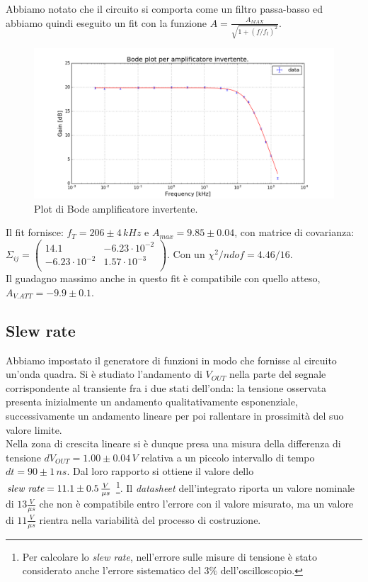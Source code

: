 \documentclass[10pt,a4paper]{article}
\begin{document}
Abbiamo notato che il circuito si comporta come un filtro passa-basso ed abbiamo quindi  eseguito un fit con la funzione $ A=\frac{A_{MAX}}{\sqrt{1+(f/f_t)^2}}$.

\begin{figure}[!htb]
  \centering
  \includegraphics[scale=0.6]{bodePlot.png}
\caption{Plot di Bode amplificatore invertente.}
\label{graficoBode}
\end{figure}

Il fit fornisce: $f_T = 206 \pm 4 \, kHz$ e $A_{max} = 9.85 \pm 0.04$, con matrice di covarianza:\\
$ \Sigma_{ij} = \left( \begin{array}{cc}
14.1 & -6.23 \cdot 10^{-2} \\ 
-6.23 \cdot 10^{-2} & 1.57 \cdot 10^{-3}\\
\end{array} \right)$. Con un $\chi^2/ndof = 4.46/16$.\\

Il guadagno massimo anche in questo fit è compatibile con quello atteso, $A_{V.ATT}= -9.9 \pm 0.1$.

\subsection{Slew rate}
Abbiamo impostato il generatore di funzioni in modo che fornisse al circuito un’onda quadra. Si è studiato l'andamento di $V_{OUT}$ nella parte del segnale corrispondente al transiente fra i due stati dell’onda: la tensione osservata presenta inizialmente un andamento qualitativamente esponenziale, successivamente un andamento lineare per poi rallentare in prossimità del suo valore limite.\\
Nella zona di crescita lineare si è dunque presa una misura della differenza di tensione $dV_{OUT} = 1.00 \pm 0.04 \, V$ relativa a un piccolo intervallo di tempo $dt=90 \pm 1 \, ns$. Dal loro rapporto si ottiene il valore dello $\emph{slew rate}= 11.1 \pm 0.5 \, \frac{V}{\mu s}$ \footnote{Per calcolare lo \emph{slew rate}, nell'errore sulle misure di tensione è stato considerato anche l'errore sistematico del $3\%$ dell'oscilloscopio.}. Il \emph{datasheet} dell'integrato riporta un valore nominale di $13 \frac{V}{\mu s}$ che non è compatibile entro l'errore con il valore misurato, ma un valore di $11 \frac{V}{\mu s}$ rientra nella variabilità del processo di costruzione.
\end{document}
